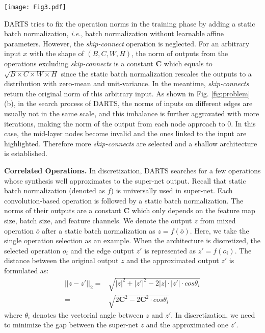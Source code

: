 \documentclass[journal]{IEEEtran}
\begin{document}
\begin{figure*}[!htb]
\begin{center}
\end{center}
	\texttt{[image: Fig3.pdf]}
   \caption{Visualization of the imbalance of nodes and the correlation between operations in a cell of DARTS: (a) the dense connection within a single cell; (b) the curves of norms of the nodes in training (normalized by the norm of Node $c_{k-2}$); and (c) the correlation matrix between operations of Node $3$ before discretization.}
\label{fig:problem}
\end{figure*} 

DARTS tries to fix the operation norms in the training phase by adding a static batch normalization, \emph{i.e.}, batch normalization without learnable affine parameters. However, the \textit{skip-connect} operation is neglected. For an arbitrary input $x$ with the shape of $(B,C,W,H)$, the norm of outputs from the operations excluding \textit{skip-connects} is a constant $\mathbf{C}$ which equals to $\sqrt{B \times C\times W\times H} $ since the static batch normalization rescales the outputs to a distribution with zero-mean and unit-variance. In the meantime, \textit{skip-connects} return the original norm of this arbitrary input. As shown in Fig. \ref{fig:problem} (b), in the search process of DARTS, the norms of inputs on different edges are usually not in the same scale, and this imbalance is further aggravated with more iterations, making the norm of the output from each node approach to 0. In this case, the mid-layer nodes become invalid and the ones linked to the input are highlighted. Therefore more \textit{skip-connects} are selected and a shallow architecture is established.


\label{Correlation}
\textbf{Correlated Operations.} In discretization, DARTS searches for a few operations whose synthesis well approximates to the super-net output. Recall that static batch normalization (denoted as $f$) is universally used in super-net. Each convolution-based operation is followed by a static batch normalization. The norms of their outputs are a constant $\mathbf{C}$ which only depends on the feature map size, batch size, and feature channels. We denote the output $z$ from mixed operation $\bar{o}$ after a static batch normalization as $z=f(\bar{o})$. Here, we take the single operation selection as an example. When the architecture is discretized, the selected operation $o_i$ and the edge output $z'$ is represented as $z'=f(o_i)$. The distance between the original output $z$ and the approximated output $z'$ is formulated as:
\begin{equation}
\begin{aligned}
||z-z'||_2=&\sqrt{ |z|^2+|z'|^2-2|z|\cdot|z'|\cdot cos\theta_i}\\=& \sqrt{2\mathbf{C}^2-2\mathbf{C}^2\cdot cos\theta_i}
\label{Formula.distance}
\end{aligned}
\end{equation}
where $\theta_i$ denotes the vectorial angle between $z$ and $z'$. In discretization, we need to minimize the gap between the super-net $z$ and the approximated one $z'$.
\end{document}
